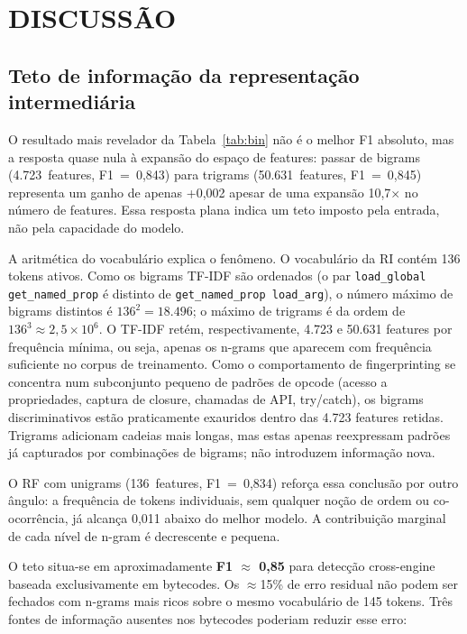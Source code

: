 \chapter{DISCUSSÃO}
\label{cap:discussao}

\section{Teto de informação da representação intermediária}
\label{sec:disc-teto}

O resultado mais revelador da Tabela~\ref{tab:bin} não é o melhor F1 absoluto, mas
a resposta quase nula à expansão do espaço de features: passar de bigrams
(4.723~features, F1~=~0,843) para trigrams (50.631~features, F1~=~0,845) representa
um ganho de apenas +0,002 apesar de uma expansão 10,7$\times$ no número de
features. Essa resposta plana indica um teto imposto pela entrada, não pela
capacidade do modelo.

A aritmética do vocabulário explica o fenômeno. O vocabulário da RI contém 136
tokens ativos. Como os bigrams TF-IDF são ordenados (o par
\texttt{load\_global get\_named\_prop} é distinto de
\texttt{get\_named\_prop load\_arg}), o número máximo de bigrams distintos é
$136^2 = 18.496$; o máximo de trigrams é da ordem de
$136^3 \approx 2{,}5 \times 10^6$. O TF-IDF retém, respectivamente, 4.723 e
50.631 features por frequência mínima, ou seja, apenas os n-grams que aparecem
com frequência suficiente no corpus de treinamento. Como o comportamento de
fingerprinting se concentra num subconjunto pequeno de padrões de opcode
(acesso a propriedades, captura de closure, chamadas de API,
try/catch), os bigrams discriminativos estão praticamente exauridos dentro
das 4.723 features retidas. Trigrams adicionam cadeias mais longas, mas estas
apenas reexpressam padrões já capturados por combinações de bigrams; não introduzem
informação nova.

O RF com unigrams (136~features, F1~=~0,834) reforça essa conclusão por outro
ângulo: a frequência de tokens individuais, sem qualquer noção de ordem ou
co-ocorrência, já alcança 0,011 abaixo do melhor modelo. A contribuição marginal de
cada nível de n-gram é decrescente e pequena.

O teto situa-se em aproximadamente \textbf{F1 $\approx$ 0,85} para detecção
cross-engine baseada exclusivamente em bytecodes. Os $\approx$15\% de erro residual
não podem ser fechados com n-grams mais ricos sobre o mesmo vocabulário de 145
tokens. Três fontes de informação ausentes nos bytecodes poderiam reduzir esse
erro:

